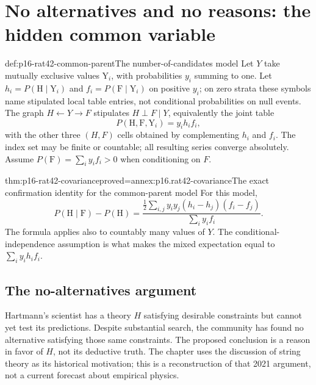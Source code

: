 \section{No alternatives and no reasons: the hidden common variable}
\label{sec:p16-rat42-search-arguments}

\begin{hbdefinition}{def:p16-rat42-common-parent}{The number-of-candidates model}
Let \(Y\) take mutually exclusive values \(\mathrm Y_i\), with
probabilities \(y_i\) summing to one. Let
\(h_i=P(\mathrm H\mid\mathrm Y_i)\) and
\(f_i=P(\mathrm F\mid\mathrm Y_i)\) on positive \(y_i\);
on zero strata these symbols name stipulated local table entries,
not conditional probabilities on null events. The graph
\(H\leftarrow Y\to F\) stipulates \(H\perp F\mid Y\),
equivalently the joint table
\[
       P(\mathrm H,\mathrm F,\mathrm Y_i)=y_i h_i f_i,
\]
with the other three \((H,F)\) cells obtained by complementing
\(h_i\) and \(f_i\). The index set may be finite or countable;
all resulting series converge absolutely. Assume
\(P(\mathrm F)=\sum_i y_i f_i>0\) when conditioning on \(F\).
\end{hbdefinition}

\begin{hblemma}{thm:p16-rat42-covariance}{proved=annex:p16.rat42-covariance}{The exact confirmation identity for the common-parent model}
For this model,
\[
 P(\mathrm H\mid\mathrm F)-P(\mathrm H)
 =\frac{\displaystyle
   \frac12\sum_{i,j}y_i y_j(h_i-h_j)(f_i-f_j)}
        {\displaystyle\sum_i y_i f_i}.
\]
The formula applies also to countably many values of \(Y\).
The conditional-independence assumption is what makes the mixed
expectation equal to \(\sum_i y_i h_i f_i\).
\end{hblemma}

\subsection{The no-alternatives argument}
\label{sec:p16-rat42-no-alternatives}

Hartmann's scientist has a theory \(H\) satisfying desirable constraints
but cannot yet test its predictions. Despite substantial search, the
community has found no alternative satisfying those same constraints.
The proposed conclusion is a reason in favor of \(H\), not its deductive
truth. The chapter uses the discussion of string theory as its historical
motivation; this is a reconstruction of that 2021 argument, not a current
forecast about empirical physics.
\cite[Sec.~4.1, pp.~260--261]{Hartmann2021BayesNets}

